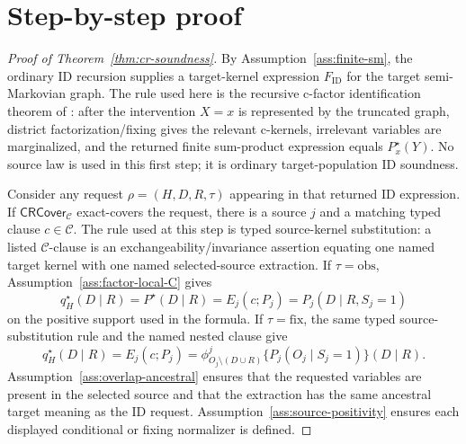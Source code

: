 \documentclass[11pt]{article}
\theoremstyle{definition}
\theoremstyle{plain}
\theoremstyle{remark}
\begin{document}
\section{Step-by-step proof}
\begin{proof}[Proof of Theorem~\ref{thm:cr-soundness}]
By Assumption~\ref{ass:finite-sm}, the ordinary ID recursion supplies a
target-kernel expression \(F_{\mathrm{ID}}\) for the target semi-Markovian
graph.  The rule used here is the recursive c-factor identification theorem
of \cite{ShpitserPearl2006ID}: after the intervention \(X=x\) is represented
by the truncated graph, district factorization/fixing gives the relevant
c-kernels, irrelevant variables are marginalized, and the returned finite
sum-product expression equals \(P^\star_x(Y)\).  No source law is used in
this first step; it is ordinary target-population ID soundness.

Consider any request \(\rho=(H,D,R,\tau)\) appearing in that returned ID
expression.  If \(\mathsf{CRCover}_{\mathcal C}\) exact-covers the request,
there is a source \(j\) and a matching typed clause \(c\in\mathcal C\).  The
rule used at this step is typed source-kernel substitution: a listed
\(\mathcal C\)-clause is an exchangeability/invariance assertion equating one
named target kernel with one named selected-source extraction.  If
\(\tau=\mathrm{obs}\), Assumption~\ref{ass:factor-local-C} gives
\[
  q^\star_H(D\mid R)=P^\star(D\mid R)
  =E_j(c;P_j)=P_j(D\mid R,S_j=1)
\]
on the positive support used in the formula.  If
\(\tau=\mathrm{fix}\), the same typed source-substitution rule and the named
nested clause give
\[
  q^\star_H(D\mid R)
  =
  E_j(c;P_j)
  =
  \phi^j_{O_j\setminus(D\cup R)}
        \{P_j(O_j\mid S_j=1)\}(D\mid R).
\]
Assumption~\ref{ass:overlap-ancestral} ensures that the requested variables
are present in the selected source and that the extraction has the same
ancestral target meaning as the ID request.  Assumption~\ref{ass:source-positivity}
ensures each displayed conditional or fixing normalizer is defined.


\end{proof}
\end{document}
